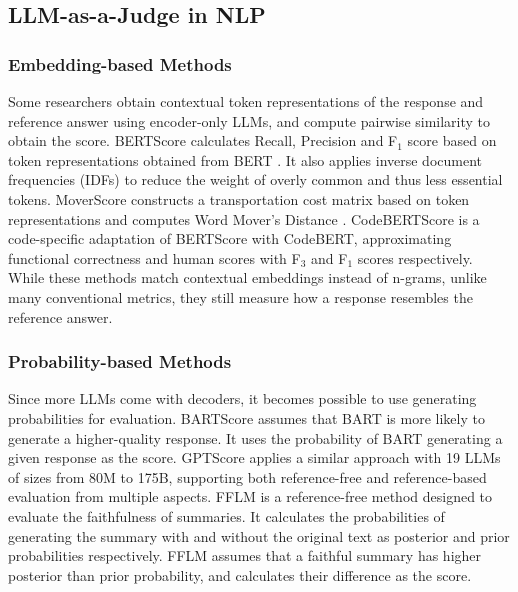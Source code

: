 \subsection{LLM-as-a-Judge in NLP}
\subsubsection{Embedding-based Methods}
Some researchers obtain contextual token representations of the response and reference answer using encoder-only LLMs, and compute pairwise similarity to obtain the score. BERTScore \cite{DBLP:conf/iclr/ZhangKWWA20} calculates Recall, Precision and F\(_1\) score based on token representations obtained from BERT \cite{DBLP:conf/naacl/DevlinCLT19}. It also applies inverse document frequencies (IDFs) to reduce the weight of overly common and thus less essential tokens. MoverScore \cite{DBLP:conf/emnlp/ZhaoPLGME19} constructs a transportation cost matrix based on token representations and computes Word Mover's Distance \cite{DBLP:conf/icml/KusnerSKW15}. CodeBERTScore \cite{DBLP:conf/emnlp/Zhou0AN23} is a code-specific adaptation of BERTScore with CodeBERT, approximating functional correctness and human scores with F\(_3\) and F\(_1\) scores respectively. While these methods match contextual embeddings instead of n-grams, unlike many conventional metrics, they still measure how a response resembles the reference answer.

\subsubsection{Probability-based Methods}
Since more LLMs come with decoders, it becomes possible to use generating probabilities for evaluation. BARTScore \cite{DBLP:conf/nips/YuanNL21} assumes that BART \cite{DBLP:conf/acl/LewisLGGMLSZ20} is more likely to generate a higher-quality response. It uses the probability of BART generating a given response as the score. GPTScore \cite{DBLP:conf/naacl/FuNJ024} applies a similar approach with 19 LLMs of sizes from 80M to 175B, supporting both reference-free and reference-based evaluation from multiple aspects. FFLM \cite{DBLP:conf/emnlp/0003RLZ23} is a reference-free method designed to evaluate the faithfulness of summaries. It calculates the probabilities of generating the summary with and without the original text as posterior and prior probabilities respectively. FFLM assumes that a faithful summary has higher posterior than prior probability, and calculates their difference as the score.

